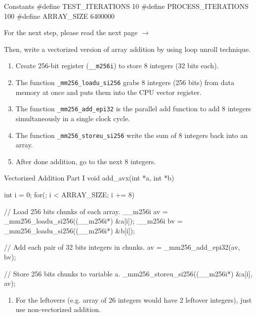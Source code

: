 \documentclass[12pt, a4paper]{article}
\begin{document}
            \begin{codeblock}[minted language=c]{Constants}
                #define TEST_ITERATIONS 10
                #define PROCESS_ITERATIONS 100
                #define ARRAY_SIZE 6400000
            \end{codeblock}

            For the next step, please read the next page $\rightarrow$

    \pagebreak

            Then, write a vectorized version of array addition by using loop unroll technique.
            \begin{enumerate}
                \item Create 256-bit register (\texttt{\_\_m256i}) to store 8 integers (32 bits each).
                \item The function \texttt{\_mm256\_loadu\_si256} grabs 8 integers (256 bits) from data memory at once and puts them into the CPU vector register.
                \item The function \texttt{\_mm256\_add\_epi32} is the parallel add function to add 8 integers simultaneously in a single clock cycle.
                \item The function \texttt{\_mm256\_storeu\_si256} write the sum of 8 integers back into an array.
                \item After done addition, go to the next 8 integers.
            \end{enumerate}

            \begin{codeblock}[minted language=c]{Vectorized Addition Part I}
                void add_avx(int *a, int *b) {
                    int i = 0;
                    for(; i < ARRAY_SIZE; i += 8) {
                        // Load 256 bits chunks of each array.
                        __m256i av = _mm256_loadu_si256((__m256i*) &a[i]);
                        __m256i bv = _mm256_loadu_si256((__m256i*) &b[i]);

                        // Add each pair of 32 bits integers in chunks.
                        av = _mm256_add_epi32(av, bv);

                        // Store 256 bits chunks to variable a.
                        _mm256_storeu_si256((__m256i*) &a[i], av);
                    }
                }
            \end{codeblock}

            \begin{enumerate}
                \item[6.] For the leftovers (e.g. array of 26 integers would have 2 leftover integers), just use non-vectorized addition.
            \end{enumerate}
\end{document}

